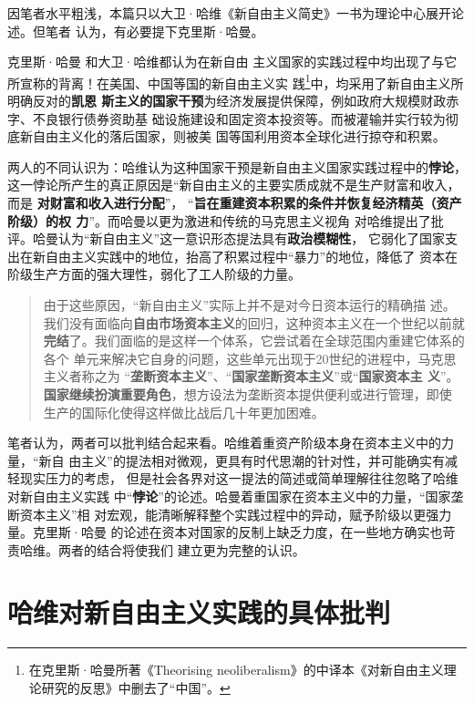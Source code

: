 因笔者水平粗浅，本篇只以大卫·哈维《新自由主义简史》一书为理论中心展开论述。但笔者
认为，有必要提下克里斯·哈曼。

克里斯·哈曼\cite{chrisharmanneo1} \cite{chrisharmanneo2}和大卫·哈维都认为在新自由
主义国家的实践过程中均出现了与它所宣称的背离！在美国、中国等国的新自由主义实
践\footnote{在克里斯·哈曼所著《Theorising neoliberalism》的中译本《对新自由主义理
  论研究的反思》中删去了“中国”。}中，均采用了新自由主义所明确反对的\textbf{凯恩
  斯主义的国家干预}为经济发展提供保障，例如政府大规模财政赤字、不良银行债券资助基
础设施建设和固定资本投资等。而被灌输并实行较为彻底新自由主义化的落后国家，则被美
国等国利用资本全球化进行掠夺和积累。

两人的不同认识为：哈维认为这种国家干预是新自由主义国家实践过程中的\textbf{悖论}，
这一悖论所产生的真正原因是“新自由主义的主要实质成就不是生产财富和收入，而是
\textbf{对财富和收入进行分配}”，
“\textbf{旨在重建资本积累的条件并恢复经济精英（资产阶级）的权
  力}”。而哈曼以更为激进和传统的马克思主义视角
对哈维提出了批评。哈曼认为“新自由主义”这一意识形态提法具有\textbf{政治模糊性}，
它弱化了国家支出在新自由主义实践中的地位，抬高了积累过程中“暴力”的地位，降低了
资本在阶级生产方面的强大理性，弱化了工人阶级的力量。
\begin{quotation}
  由于这些原因，“新自由主义”实际上并不是对今日资本运行的精确描
  述。我们没有面临向\textbf{自由市场资本主义}的回归，这种资本主义在一个世纪以前就
  \textbf{完结}了。我们面临的是这样一个体系，它尝试着在全球范围内重建它体系的各个
  单元来解决它自身的问题，这些单元出现于20世纪的进程中，马克思主义者称之为
  “\textbf{垄断资本主义}”、“\textbf{国家垄断资本主义}”或“\textbf{国家资本主
    义}”。\textbf{国家继续扮演重要角色}，想方设法为垄断资本提供便利或进行管理，即使
  生产的国际化使得这样做比战后几十年更加困难。
\end{quotation}

笔者认为，两者可以批判结合起来看。哈维着重资产阶级本身在资本主义中的力量，“新自
由主义”的提法相对微观，更具有时代思潮的针对性，并可能确实有减轻现实压力的考虑，
但是社会各界对这一提法的简述或简单理解往往忽略了哈维对新自由主义实践
中“\textbf{悖论}”的论述。哈曼着重国家在资本主义中的力量，“国家垄断资本主义”相
对宏观，能清晰解释整个实践过程中的异动，赋予阶级以更强力量。克里斯·哈曼
的论述在资本对国家的反制上缺乏力度，在一些地方确实也苛责哈维。两者的结合将使我们
建立更为完整的认识。

\section{哈维对新自由主义实践的具体批判}

